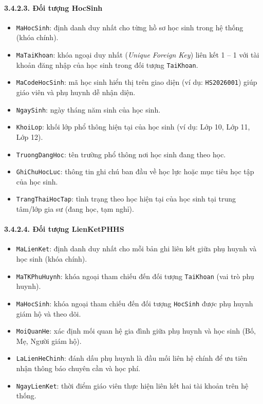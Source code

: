 \paragraph{3.4.2.3. Đối tượng HocSinh}\mbox{}
\begin{itemize}\setlength{\itemsep}{2pt}\setlength{\parskip}{0pt}
    \item \texttt{MaHocSinh}: định danh duy nhất cho từng hồ sơ học sinh trong hệ thống (khóa chính).
    \item \texttt{MaTaiKhoan}: khóa ngoại duy nhất (\textit{Unique Foreign Key}) liên kết 1 -- 1 với tài khoản đăng nhập của học sinh trong đối tượng \texttt{TaiKhoan}.
    \item \texttt{MaCodeHocSinh}: mã học sinh hiển thị trên giao diện (ví dụ: \texttt{HS2026001}) giúp giáo viên và phụ huynh dễ nhận diện.
    \item \texttt{NgaySinh}: ngày tháng năm sinh của học sinh.
    \item \texttt{KhoiLop}: khối lớp phổ thông hiện tại của học sinh (ví dụ: Lớp 10, Lớp 11, Lớp 12).
    \item \texttt{TruongDangHoc}: tên trường phổ thông nơi học sinh đang theo học.
    \item \texttt{GhiChuHocLuc}: thông tin ghi chú ban đầu về học lực hoặc mục tiêu học tập của học sinh.
    \item \texttt{TrangThaiHocTap}: tình trạng theo học hiện tại của học sinh tại trung tâm/lớp gia sư (đang học, tạm nghỉ).
\end{itemize}

\paragraph{3.4.2.4. Đối tượng LienKetPHHS}\mbox{}
\begin{itemize}\setlength{\itemsep}{2pt}\setlength{\parskip}{0pt}
    \item \texttt{MaLienKet}: định danh duy nhất cho mỗi bản ghi liên kết giữa phụ huynh và học sinh (khóa chính).
    \item \texttt{MaTKPhuHuynh}: khóa ngoại tham chiếu đến đối tượng \texttt{TaiKhoan} (vai trò phụ huynh).
    \item \texttt{MaHocSinh}: khóa ngoại tham chiếu đến đối tượng \texttt{HocSinh} được phụ huynh giám hộ và theo dõi.
    \item \texttt{MoiQuanHe}: xác định mối quan hệ gia đình giữa phụ huynh và học sinh (Bố, Mẹ, Người giám hộ).
    \item \texttt{LaLienHeChinh}: đánh dấu phụ huynh là đầu mối liên hệ chính để ưu tiên nhận thông báo chuyên cần và học phí.
    \item \texttt{NgayLienKet}: thời điểm giáo viên thực hiện liên kết hai tài khoản trên hệ thống.
\end{itemize}

